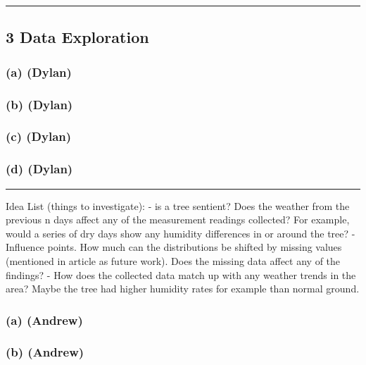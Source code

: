\documentclass[
  twocolumn]{article}
\begin{document}
\begin{center}\rule{0.5\linewidth}{0.5pt}\end{center}

\hypertarget{data-exploration}{%
\subsection{3 Data Exploration}\label{data-exploration}}

\hypertarget{a-dylan}{%
\subsubsection{(a) (Dylan)}\label{a-dylan}}

\hypertarget{b-dylan}{%
\subsubsection{(b) (Dylan)}\label{b-dylan}}

\hypertarget{c-dylan}{%
\subsubsection{(c) (Dylan)}\label{c-dylan}}

\hypertarget{d-dylan}{%
\subsubsection{(d) (Dylan)}\label{d-dylan}}

\begin{center}\rule{0.5\linewidth}{0.5pt}\end{center}

Idea List (things to investigate): - is a tree sentient? Does the
weather from the previous n days affect any of the measurement readings
collected? For example, would a series of dry days show any humidity
differences in or around the tree? - Influence points. How much can the
distributions be shifted by missing values (mentioned in article as
future work). Does the missing data affect any of the findings? - How
does the collected data match up with any weather trends in the area?
Maybe the tree had higher humidity rates for example than normal ground.

\hypertarget{a-andrew}{%
\subsubsection{(a) (Andrew)}\label{a-andrew}}

\hypertarget{b-andrew}{%
\subsubsection{(b) (Andrew)}\label{b-andrew}}
\end{document}

